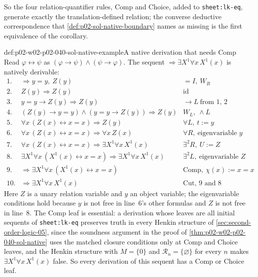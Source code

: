 So the four relation-quantifier rules, Comp and Choice, added to
\texttt{sheet:lk-eq}, generate exactly the translation-defined relation; the
converse deductive correspondence that
\cref{def:p02-sol-native-boundary} names as missing is the first equivalence
of the corollary.

\begin{hbexample}{def:p02-w02-p02-040-sol-native-example}{A native derivation that needs Comp}
Read \(\varphi\leftrightarrow\psi\) as \((\varphi\to\psi)\land(\psi\to\varphi)\).
The sequent \(\Rightarrow\exists X^1\forall x\,X^1(x)\) is natively derivable:
\[
\begin{array}{rll}
 1. & \Rightarrow y=y,\ Z(y) & {=}I,\ W_R\\
 2. & Z(y)\Rightarrow Z(y) & \mathrm{id}\\
 3. & y=y\to Z(y)\Rightarrow Z(y) & {\to}L\ \text{from 1, 2}\\
 4. & (Z(y)\to y=y)\land(y=y\to Z(y))\Rightarrow Z(y) & W_L,\ {\land}L\\
 5. & \forall x\,(Z(x)\leftrightarrow x=x)\Rightarrow Z(y) & \forall L,\ t:=y\\
 6. & \forall x\,(Z(x)\leftrightarrow x=x)\Rightarrow\forall x\,Z(x) & \forall R,\ \text{eigenvariable }y\\
 7. & \forall x\,(Z(x)\leftrightarrow x=x)\Rightarrow\exists X^1\forall x\,X^1(x) & \exists^2R,\ U:=Z\\
 8. & \exists X^1\forall x\,(X^1(x)\leftrightarrow x=x)\Rightarrow\exists X^1\forall x\,X^1(x) & \exists^2L,\ \text{eigenvariable }Z\\
 9. & \Rightarrow\exists X^1\forall x\,(X^1(x)\leftrightarrow x=x) & \text{Comp},\ \chi(x):=x=x\\
 10. & \Rightarrow\exists X^1\forall x\,X^1(x) & \text{Cut, 9 and 8}
\end{array}
\]
Here \(Z\) is a unary relation variable and \(y\) an object variable; the
eigenvariable conditions hold because \(y\) is not free in line~6's
other formulas and \(Z\) is not free in line~8.  The Comp leaf is
essential: a derivation whose leaves are all initial sequents of
\texttt{sheet:lk-eq} preserves truth in every Henkin structure of
\cref{sec:second-order-logic-05}, since the soundness argument in the proof
of \cref{thm:p02-w02-p02-040-sol-native} uses the matched closure conditions
only at Comp and Choice leaves, and the Henkin structure with \(M=\{0\}\)
and \(\mathcal R_n=\{\varnothing\}\) for every \(n\) makes
\(\exists X^1\forall x\,X^1(x)\) false.  So every derivation of this sequent
has a Comp or Choice leaf.
\end{hbexample}

